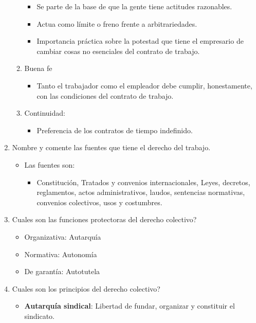\documentclass[spanish,12pt,a4paper,titlepage]{report}
\begin{document}
\begin{enumerate}
\begin{enumerate}
\begin{itemize}
    \item Se parte de la base de que la gente tiene actitudes razonables.
    \item Actua como límite o freno frente a arbitrariedades.
    \item Importancia práctica sobre la potestad que tiene el empresario de cambiar cosas no esenciales del contrato de trabajo.
    \end{itemize}
  \item Buena fe
    \begin{itemize}
    \item Tanto el trabajador como el empleador debe cumplir, honestamente, con las condiciones del contrato de trabajo.
    \end{itemize}
  \item Continuidad:
    \begin{itemize}
    \item Preferencia de los contratos de tiempo indefinido.
    \end{itemize}
  \end{enumerate}
\item Nombre y comente las fuentes que tiene el derecho del trabajo.
  \begin{itemize}
  \item Las fuentes son:
    \begin{itemize}
    \item Constitución, Tratados y convenios internacionales, Leyes, decretos, reglamentos, actos administrativos, laudos, sentencias normativas, convenios colectivos, usos y costumbres.
    \end{itemize}
  \end{itemize}
\item Cuales son las funciones protectoras del derecho colectivo?
  \begin{itemize}
  \item Organizativa: Autarquía
  \item Normativa: Autonomía
  \item De garantía: Autotutela
  \end{itemize}
\item Cuales son los principios del derecho colectivo?
  \begin{itemize}
  \item \textbf{Autarquía sindical}: Libertad de fundar, organizar y constituir el sindicato.

\end{itemize}
\end{enumerate}
\end{document}
